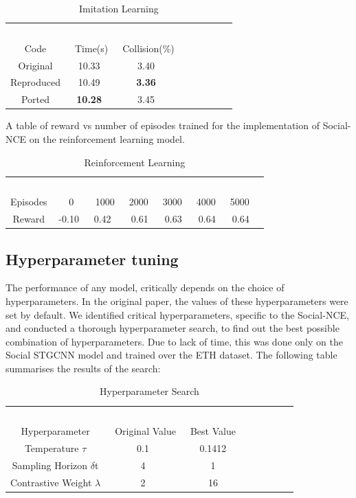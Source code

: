 \begin{table}[H]
\caption{Imitation Learning} %
\centering %
\begin{tabular}{ccc rrrrr} 
\hline 
&\ \ \ \ \ \\
Code&\ Time(s)&\ Collision(\%)&\ \\ [0.5ex]
\hline 
Original &    10.33 & 3.40\\
Reproduced &  10.49 & {\bf{3.36}}\\
Ported &   {\bf{10.28}} & 3.45\\


\hline %
\end{tabular}
\label{tab:hresult}
\end{table}

A table of reward vs number of episodes trained for the implementation of Social-NCE on the reinforcement learning model.
\begin{table}[H]
\caption{Reinforcement Learning} %
\centering %
\begin{tabular}{ccc rrrrr} 
\hline 
&\ \ \ \ \ \\
Episodes&\ 0&\ 1000&\ 2000&\ 3000&\ 4000&\ 5000&\\ [0.5ex]
\hline 
Reward&    -0.10& 0.42& 0.61& 0.63& 0.64& 0.64&\\



\hline %
\end{tabular}
\label{tab:hresult}
\end{table}
\subsection{Hyperparameter tuning}
The performance of any model, critically depends on the choice of hyperparameters. In the original paper, the values of these hyperparameters were set by default. We identified critical hyperparameters, specific to the Social-NCE, and conducted a thorough hyperparameter search, to find out the best possible combination of hyperparameters. Due to lack of time, this was done only on the Social STGCNN model and trained over the ETH dataset.
The following table summarises the results of the search:
\begin{table}[H]
\caption{Hyperparameter Search} %
\centering %
\begin{tabular}{ccc rrrrr} 
\hline 
&\ \ \ \ \ \\
Hyperparameter&\ Original Value&\ Best Value\ \\ [0.5ex]
\hline 
Temperature $\tau$ &  0.1 & 0.1412\\
Sampling Horizon $\delta$t & 4 & 1\\
Contrastive Weight $\lambda$  &  2 & 16\\
\hline %
\end{tabular}
\label{tab:hresult}
\end{table}

